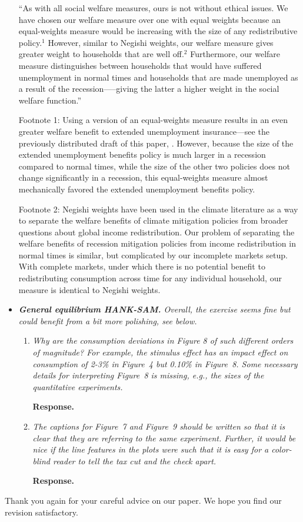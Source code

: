 \documentclass[12pt,letterpaper,english]{article}
\begin{document}
\begin{itemize}
	``As with all social welfare measures, ours is not without ethical issues.  We have chosen our welfare measure over one with equal weights because an equal-weights measure would be increasing with the size of any redistributive policy.$^1$ However, similar to Negishi weights, our welfare measure gives greater weight to households that are well off.$^2$  Furthermore, our welfare measure distinguishes between households that would have suffered unemployment in normal times and households that are made unemployed as a result of the recession—--giving the latter a higher weight in the social welfare function.''
	
	Footnote 1: Using a version of an equal-weights measure results in an even greater welfare benefit to extended unemployment insurance---see the previously distributed draft of this paper, \cite{carroll2023welfare}.  However, because the size of the extended unemployment benefits policy is much larger in a recession compared to normal times, while the size of the other two policies does not change significantly in a recession, this equal-weights measure almost mechanically favored the extended unemployment benefits policy.
	
	Footnote 2: Negishi weights have been used in the climate literature as a way to separate the welfare benefits of climate mitigation policies from broader questions about global income redistribution. Our problem of separating the welfare benefits of recession mitigation policies from income redistribution in normal times is similar, but complicated by our incomplete markets setup. With complete markets, under which there is no potential benefit to redistributing consumption across time for any individual household, our measure is identical to Negishi weights.
 
	
	\item \textit{\textbf{General equilibrium HANK-SAM.} Overall, the exercise seems fine but
		could benefit from a bit more polishing, see below.}
		
	\begin{enumerate}[start=2]
		\item \textit{Why are the consumption deviations in Figure 8 of such different orders			of magnitude? For example, the stimulus effect has an impact effect on consumption of 2-3\% in Figure~4 but 0.10\% in Figure~8. Some necessary details for interpreting Figure~8 is missing, e.g., the sizes of the quantitative experiments.}

		\noindent \textbf{Response.}  
		
		\item \textit{The captions for Figure~7 and Figure~9 should be written so that it is clear that they are referring to the same experiment. Further, it would be nice if the line features in the plots were such that it is easy for a color-blind reader to tell the tax cut and the check apart.}
		
		\noindent \textbf{Response.}  	
			
	\end{enumerate}
	

	
\end{itemize}

	
	\bigskip
	
	\noindent Thank you again for your careful advice on our paper. We hope you find our revision satisfactory.
	


\end{document}
